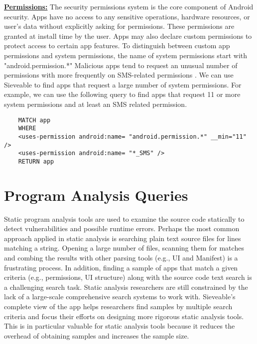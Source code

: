 \underline{\textbf{Permissions:}}
The security permissions system is the core component of Android security.
Apps have no access to any sensitive operations, hardware resources, or user's data without explicitly asking for permissions. These permissions are granted at install time by the user.
Apps may also declare custom permissions to protect access to certain app features.
To distinguish between custom app permissions and system permissions, the name of system permissions start with "android.permission.*"
Malicious apps tend to request an unusual number of permissions with more frequently on SMS-related permissions \cite{zhou_2012_SP_dissecting}.
We can use Sieveable to find apps that request a large number of system permissions.
For example, we can use the following query to find apps that request 11 or more system permissions and at least an SMS related permission.

\begin{verbatim}
	MATCH app
	WHERE
	<uses-permission android:name= "android.permission.*" __min="11" />
	<uses-permission android:name= "*_SMS" />
	RETURN app
\end{verbatim}

\section{Program Analysis Queries}
Static program analysis tools are used to examine the source code statically to detect vulnerabilities and possible runtime errors.
Perhaps the most common approach applied in static analysis is searching plain text source files for lines matching a string.
Opening a large number of files, scanning them for matches and combing the results with other parsing tools (e.g., UI and Manifest) is a frustrating process. 
In addition, finding a sample of apps that match a given criteria (e.g., permissions, UI structure) along with the source code text search is a challenging search task.
Static analysis researchers are still constrained by the lack of a large-scale comprehensive search systems to work with.
Sieveable's complete view of the app helps researchers find samples by multiple search criteria and focus their efforts on designing more rigorous static analysis tools.
This is in particular valuable for static analysis tools because it reduces the overhead of obtaining samples and increases the sample size.

